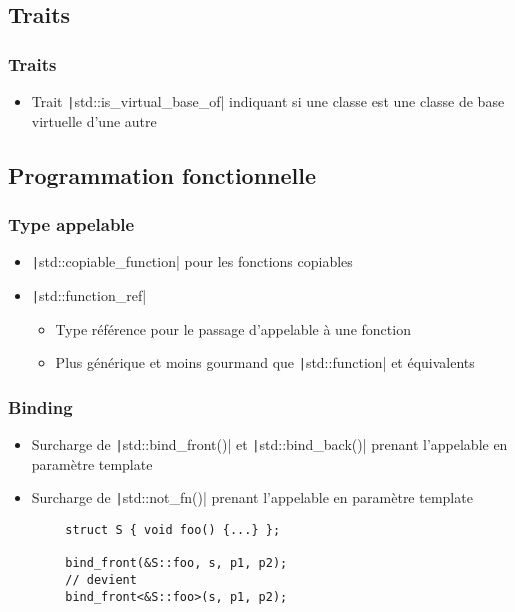 \documentclass[C++.tex]{subfiles}
\begin{document}
\subsection*{Traits}
\begin{frame}[fragile]
	\frametitle{Traits}
	\begin{itemize}
		\item Trait \texttt|std::is_virtual_base_of| indiquant si une classe est une classe de base virtuelle d'une autre
	\end{itemize}

\end{frame}

\subsection*{Programmation fonctionnelle}
\begin{frame}[fragile]
	\frametitle{Type appelable}
	\begin{itemize}
		\item \texttt|std::copiable_function| pour les fonctions copiables
		\item \texttt|std::function_ref|
		\begin{itemize}
			\item Type référence pour le passage d'appelable à une fonction
			\item Plus générique et moins gourmand que \texttt|std::function| et équivalents

		\end{itemize}
	\end{itemize}

\end{frame}

\begin{frame}[fragile]
	\frametitle{Binding}
	\begin{itemize}
		\item Surcharge de \texttt|std::bind_front()| et \texttt|std::bind_back()| prenant l'appelable en paramètre template
		\item Surcharge de \texttt|std::not_fn()| prenant l'appelable en paramètre template
	\end{itemize}

	\begin{verbatim}
		struct S { void foo() {...} };

		bind_front(&S::foo, s, p1, p2);
		// devient
		bind_front<&S::foo>(s, p1, p2);
	\end{verbatim}

\end{frame}
\end{document}
